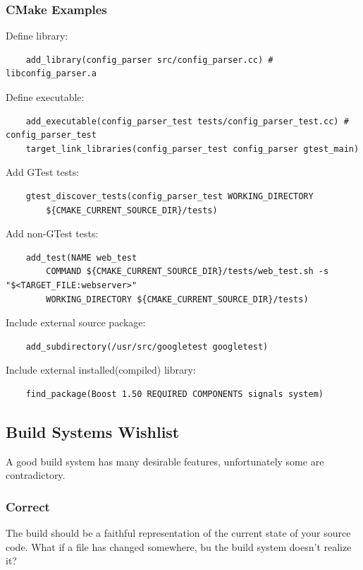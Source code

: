 \documentclass{article}
\begin{document}
\subsubsection{CMake Examples}

Define library:
\begin{verbatim}
    add_library(config_parser src/config_parser.cc) # libconfig_parser.a
\end{verbatim}

Define executable:
\begin{verbatim}
    add_executable(config_parser_test tests/config_parser_test.cc) # config_parser_test 
    target_link_libraries(config_parser_test config_parser gtest_main) 
\end{verbatim}

Add GTest tests:
\begin{verbatim}
    gtest_discover_tests(config_parser_test WORKING_DIRECTORY 
        ${CMAKE_CURRENT_SOURCE_DIR}/tests)
\end{verbatim}

Add non-GTest tests:
\begin{verbatim}
    add_test(NAME web_test
        COMMAND ${CMAKE_CURRENT_SOURCE_DIR}/tests/web_test.sh -s "$<TARGET_FILE:webserver>"
        WORKING_DIRECTORY ${CMAKE_CURRENT_SOURCE_DIR}/tests)
\end{verbatim}

Include external source package:
\begin{verbatim}
    add_subdirectory(/usr/src/googletest googletest)
\end{verbatim}

Include external installed(compiled) library:
\begin{verbatim}
    find_package(Boost 1.50 REQUIRED COMPONENTS signals system)
\end{verbatim}

\subsection{Build Systems Wishlist}

A good build system has many desirable features, unfortunately some are contradictory.

\subsubsection{Correct}

The build should be a faithful representation of the current state of your source code. What if a file has changed somewhere, bu the build system doesn't realize it?
\end{document}
